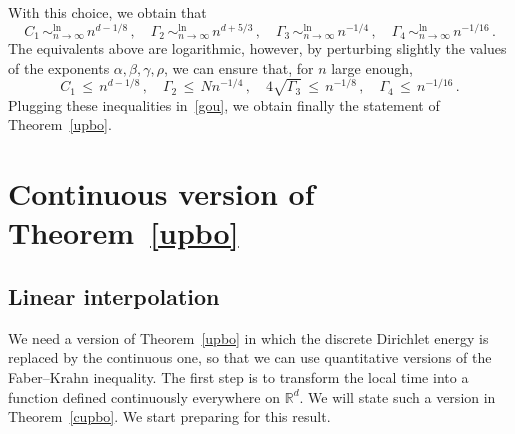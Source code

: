 \documentclass[10pt]{amsart}
\theoremstyle{definition}\newtheorem{defi}[theo]{Definition}\newtheorem{rema}[theo]{Remark}\newtheorem{exam}[theo]{Example}\newtheorem{exem}[theo]{Example}\newtheorem{nota}[theo]{Notation}
\newcommand*\lsim{\mathop{\sim}^{\ln}_{n\to\infty}}
\newcommand*\R{\mathbb{R}}
\begin{document}
With this choice, we obtain that
\begin{equation*}
C_1\,\lsim\,n^{d-1/8}\,,
\quad
\Gamma_2\,\lsim\,n^{d+5/3}\,,
\quad
\Gamma_3\,\lsim\,n^{-1/4}\,,
\quad
\Gamma_4\,\lsim\,n^{-1/16}\,.
\end{equation*}
The equivalents above are logarithmic, however, by perturbing slightly the values of the exponents $\alpha,\beta,\gamma,\rho$, we can ensure that, for $n$ large enough,
\begin{equation*}
C_1\,\leq\,n^{d-1/8}\,,
\quad {\Gamma_2}\,\leq\,Nn^{-1/4}\,,
\quad 4\sqrt{\Gamma_3}\,\leq\,n^{-1/8}\,,
\quad
\Gamma_4\,\leq\,n^{-1/16}\,.
\end{equation*}
Plugging these inequalities in~\eqref{gou}, we obtain finally the statement of Theorem~\ref{upbo}.

\section{Continuous version of Theorem~\ref{upbo}}\label{S:continuous}

\subsection{Linear interpolation}\label{lini}

We need a version of Theorem~\ref{upbo} in which the discrete Dirichlet energy is replaced by the continuous one, so that we can use quantitative versions of the Faber--Krahn inequality. The first step is to transform the local time into a function defined continuously everywhere on $\R^d$. We will state such a version in Theorem~\ref{cupbo}. We start preparing for this result.
\end{document}
